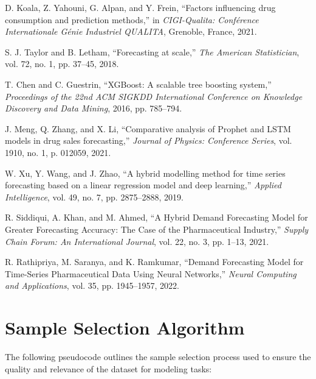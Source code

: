 \documentclass[journal]{IEEEtran}
\begin{document}
\begin{thebibliography}{99}

    D. Koala, Z. Yahouni, G. Alpan, and Y. Frein, “Factors influencing drug consumption and prediction methods,” in \textit{CIGI-Qualita: Conférence Internationale Génie Industriel QUALITA}, Grenoble, France, 2021.
    
    S. J. Taylor and B. Letham, “Forecasting at scale,” \textit{The American Statistician}, vol. 72, no. 1, pp. 37–45, 2018.

    T. Chen and C. Guestrin, “XGBoost: A scalable tree boosting system,” \textit{Proceedings of the 22nd ACM SIGKDD International Conference on Knowledge Discovery and Data Mining}, 2016, pp. 785–794.

    J. Meng, Q. Zhang, and X. Li, “Comparative analysis of Prophet and LSTM models in drug sales forecasting,” \textit{Journal of Physics: Conference Series}, vol. 1910, no. 1, p. 012059, 2021.

    W. Xu, Y. Wang, and J. Zhao, “A hybrid modelling method for time series forecasting based on a linear regression model and deep learning,” \textit{Applied Intelligence}, vol. 49, no. 7, pp. 2875–2888, 2019.

    R. Siddiqui, A. Khan, and M. Ahmed, “A Hybrid Demand Forecasting Model for Greater Forecasting Accuracy: The Case of the Pharmaceutical Industry,” \textit{Supply Chain Forum: An International Journal}, vol. 22, no. 3, pp. 1–13, 2021.

    R. Rathipriya, M. Saranya, and K. Ramkumar, “Demand Forecasting Model for Time-Series Pharmaceutical Data Using Neural Networks,” \textit{Neural Computing and Applications}, vol. 35, pp. 1945–1957, 2022.

\end{thebibliography}

\appendix
\section{Sample Selection Algorithm}
\label{appendix:sample-selection}

The following pseudocode outlines the sample selection process used to ensure the quality and relevance of the dataset for modeling tasks:
\end{document}
